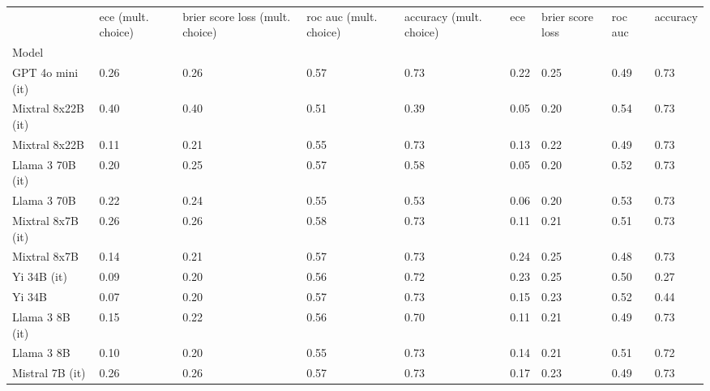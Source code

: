 \begin{tabular}{lllllllll}
\toprule
 & ece (mult. choice) & brier score loss (mult. choice) & roc auc (mult. choice) & accuracy (mult. choice) & ece & brier score loss & roc auc & accuracy \\
Model &  &  &  &  &  &  &  &  \\
\midrule
GPT 4o mini (it) & 0.26 & 0.26 & \cellcolor{cyan!0.6} 0.57 & \cellcolor{cyan!25.0} 0.73 & 0.22 & 0.25 & 0.49 & \cellcolor{cyan!25.0} 0.73 \\
Mixtral 8x22B (it) & 0.40 & 0.40 & \cellcolor{orange!12.8} 0.51 & 0.39 & 0.05 & \cellcolor{cyan!17.9} 0.20 & \cellcolor{cyan!25.0} 0.54 & \cellcolor{cyan!25.0} 0.73 \\
Mixtral 8x22B & \cellcolor{cyan!10.2} 0.11 & \cellcolor{cyan!21.2} 0.21 & 0.55 & \cellcolor{cyan!25.0} 0.73 & 0.13 & 0.22 & 0.49 & \cellcolor{cyan!25.0} 0.73 \\
Llama 3 70B (it) & 0.20 & \cellcolor{cyan!1.5} 0.25 & 0.57 & 0.58 & 0.05 & \cellcolor{cyan!10.7} 0.20 & 0.52 & \cellcolor{cyan!25.0} 0.73 \\
Llama 3 70B & 0.22 & \cellcolor{cyan!4.8} 0.24 & 0.55 & 0.53 & 0.06 & \cellcolor{cyan!7.1} 0.20 & 0.53 & \cellcolor{cyan!20.7} 0.73 \\
Mixtral 8x7B (it) & 0.26 & 0.26 & \cellcolor{cyan!12.8} 0.58 & \cellcolor{cyan!25.0} 0.73 & 0.11 & 0.21 & 0.51 & \cellcolor{cyan!25.0} 0.73 \\
Mixtral 8x7B & \cellcolor{cyan!0.8} 0.14 & \cellcolor{cyan!18.9} 0.21 & 0.57 & \cellcolor{cyan!25.0} 0.73 & 0.24 & 0.25 & \cellcolor{orange!25.0} 0.48 & \cellcolor{cyan!25.0} 0.73 \\
Yi 34B (it) & \cellcolor{cyan!18.2} 0.09 & \cellcolor{cyan!23.1} 0.20 & 0.56 & \cellcolor{cyan!15.4} 0.72 & 0.23 & 0.25 & 0.50 & \cellcolor{orange!25.0} 0.27 \\
Yi 34B & \cellcolor{cyan!25.0} 0.07 & \cellcolor{cyan!25.0} 0.20 & 0.57 & \cellcolor{cyan!20.7} 0.73 & 0.15 & 0.23 & 0.52 & 0.44 \\
Llama 3 8B (it) & 0.15 & \cellcolor{cyan!13.7} 0.22 & 0.56 & \cellcolor{cyan!5.3} 0.70 & 0.11 & 0.21 & 0.49 & \cellcolor{cyan!23.4} 0.73 \\
Llama 3 8B & \cellcolor{cyan!12.5} 0.10 & \cellcolor{cyan!21.7} 0.20 & 0.55 & \cellcolor{cyan!24.5} 0.73 & 0.14 & 0.21 & 0.51 & \cellcolor{cyan!19.1} 0.72 \\
Mistral 7B (it) & 0.26 & 0.26 & 0.57 & \cellcolor{cyan!25.0} 0.73 & 0.17 & 0.23 & 0.49 & \cellcolor{cyan!24.5} 0.73 \\

\end{tabular}
